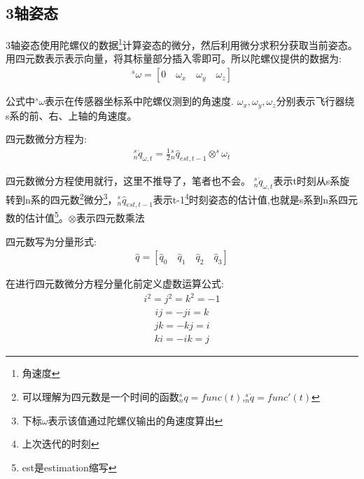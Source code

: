 \documentclass[12pt,a4paper]{article}
\begin{document}
\subsection{3轴姿态}
3轴姿态使用陀螺仪的数据\footnote{角速度}计算姿态的微分，然后利用微分求积分获取当前姿态。用四元数表示表示向量，将其标量部分插入零即可。所以陀螺仪提供的数据为:
\begin{eqnarray}
    ^s\omega=[0\quad\omega_{x}\quad\omega_{y}\quad\omega_{z}] \label{陀螺仪数据}
\end{eqnarray}

公式中$^s\omega$表示在传感器坐标系中陀螺仪测到的角速度.
$\omega_{x},\omega_{y},\omega_{z}$分别表示飞行器绕s系的前、右、上轴的角速度。

四元数微分方程为:
\begin{eqnarray}
    ^s_n\dot{q}_{\omega,t}=\frac{1}{2}{^s_n\hat{q}_{est,t-1}}\otimes^s\omega_t \label{四元数微分方程}
\end{eqnarray}

四元数微分方程使用就行，这里不推导了，笔者也不会。
$^s_n\dot{q}_{\omega,t}$表示t时刻从s系旋转到n系的四元数\footnote{可以理解为四元数是一个时间的函数$^s_n{q}=func(t)$,$^s_n\dot{q}=func'(t)$}微分\footnote{下标$\omega$表示该值通过陀螺仪输出的角速度算出}，${^s_n\hat{q}_{est,t-1}}$表示t-1\footnote{上次迭代的时刻}时刻姿态的估计值,也就是s系到n系四元数的估计值\footnote{est是estimation缩写}。$\otimes$表示四元数乘法

四元数写为分量形式:
\begin{eqnarray}
    \hat{q}=[\hat{q}_0\quad \hat{q}_1\quad \hat{q}_2\quad \hat{q}_3] \label{分量四元数}
\end{eqnarray}

在进行四元数微分方程分量化前定义虚数运算公式:
\begin{eqnarray}
    i^2 = j^2 = k^2 = -1
\end{eqnarray}
\begin{eqnarray}
    ij = -ji = k
\end{eqnarray}
\begin{eqnarray}
    jk = -kj = i
\end{eqnarray}
\begin{eqnarray}
    ki = -ik = j
\end{eqnarray}
\end{document}
